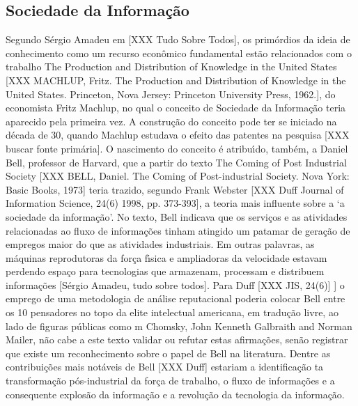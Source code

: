 \documentclass[
12pt,		%
openright,	%
twoside,  %
a4paper,			%
chapter=TITLE,		%
english,			%
french,				%
spanish,			%
brazil				%
]{USPSC-classe/USPSC_RedarTex}
\begin{document}
\subsection[Sociedade da Informa\c{c}\~ao]{Sociedade da Informa\c{c}\~ao}\label{Sociedade da Informa\c{c}\~ao}
Segundo S\'ergio Amadeu em [XXX Tudo Sobre Todos], os prim\'ordios da ideia de conhecimento como um recurso econ\^omico fundamental est\~ao relacionados com o trabalho \textquotedbl The Production and Distribution of Knowledge in the United States [XXX MACHLUP, Fritz. The Production and Distribution of Knowledge in the United States. Princeton, Nova Jersey: Princeton University Press, 1962.], do economista Fritz Machlup, no qual o conceito de Sociedade da Informa\c{c}\~ao teria aparecido pela primeira vez. A constru\c{c}\~ao do conceito pode ter se iniciado na d\'ecada de 30, quando Machlup estudava o efeito das patentes na pesquisa [XXX buscar fonte prim\'aria]. O nascimento do conceito \'e atribu\'{\i}do, tamb\'em, a Daniel Bell, professor de Harvard, que a partir do texto \textquotedbl The Coming of Post Industrial Society [XXX BELL, Daniel. The Coming of Post-industrial Society. Nova York: Basic Books, 1973] teria trazido, segundo Frank Webster [XXX Duff Journal of Information Science, 24(6) 1998, pp. 373-393], \textquotedbl a teoria mais influente sobre a ‘a sociedade da informa\c{c}\~ao’. No texto, Bell indicava que os servi\c{c}os e as atividades relacionadas ao fluxo de informa\c{c}\~oes tinham atingido um patamar de gera\c{c}\~ao de empregos maior do que as atividades industriais. Em outras palavras, \textquotedbl as m\'aquinas reprodutoras da for\c{c}a f\'{\i}sica e ampliadoras da velocidade estavam perdendo espa\c{c}o para tecnologias que armazenam, processam e distribuem informa\c{c}\~oes [S\'ergio Amadeu, tudo sobre todos]. Para Duff [XXX JIS, 24(6)] ] o emprego de uma metodologia de an\'alise \textquotedbl reputacional poderia colocar Bell entre os 10 pensadores no topo da elite intelectual americana, em tradu\c{c}\~ao livre, \textquotedbl ao lado de figuras p\'ublicas como m Chomsky, John Kenneth Galbraith and Norman Mailer, n\~ao cabe a este texto validar ou refutar estas afirma\c{c}\~oes, sen\~ao registrar que existe um reconhecimento sobre o papel de Bell na literatura. Dentre as contribui\c{c}\~oes mais not\'aveis de Bell [XXX Duff] estariam a identifica\c{c}\~ao ta transforma\c{c}\~ao p\'os-industrial da for\c{c}a de trabalho, o fluxo de informa\c{c}\~oes e a consequente \textquotedbl explos\~ao da informa\c{c}\~ao e a \textquotedbl revolu\c{c}\~ao da tecnologia da informa\c{c}\~ao. 
\end{document}
